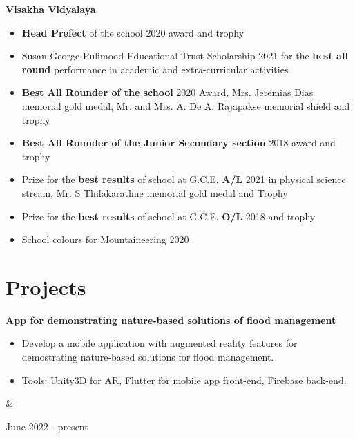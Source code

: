 \documentclass[10pt, a4paper]{article}
\newenvironment{highlights}{
        \begin{itemize}[
                topsep=0pt,
                parsep=0.10 cm,
                partopsep=0pt,
                itemsep=0pt,
                after=\vspace{-1\baselineskip},
                leftmargin=0.4 cm + 3pt
            ]
    }{
        \end{itemize}
    } %
\let\originalTabularx\tabularx
\let\originalEndTabularx\endtabularx
\renewenvironment{tabularx}{\bgroup\centering\originalTabularx}{\originalEndTabularx\par\egroup}
\begin{document}
        \textbf{Visakha Vidyalaya}  \begin{highlights}
        \item \textbf{Head Prefect} of the school 2020 award and trophy
        \item Susan George Pulimood Educational Trust Scholarship 2021 for the \textbf{best all round} performance in academic and extra-curricular activities
	   \item \textbf{Best All Rounder of the school} 2020 Award, Mrs. Jeremias Dias memorial gold medal, Mr. and Mrs. A. De A. Rajapakse memorial shield and trophy
	   \item \textbf{Best All Rounder of the Junior Secondary section} 2018 award and trophy
		\item Prize for the \textbf{best results} of school at G.C.E. \textbf{A/L} 2021 in physical science stream, Mr. S Thilakarathne memorial gold medal and Trophy
		\item Prize for the \textbf{best results} of school at G.C.E. \textbf{O/L} 2018 and trophy
		\item School colours for Mountaineering 2020
	\end{highlights}
        \par\endgroup
    
    \vspace{0.4 cm}
    
    \section{Projects}

        \begin{tabularx}{
            \textwidth-0.4 cm-0.13cm
        }{
            K{0.2 cm}
            R{4.1 cm}
        }
            \textbf{App for demonstrating nature-based solutions of flood management}

            \vspace{0.10 cm}

            \begin{highlights}
                \item Develop a mobile application with augmented reality features for demostrating nature-based solutions for flood management.
                \item Tools: Unity3D for AR, Flutter for mobile app front-end, Firebase back-end.
            \end{highlights}
            &
            

            June 2022 - present
        \end{tabularx}
\end{document}
